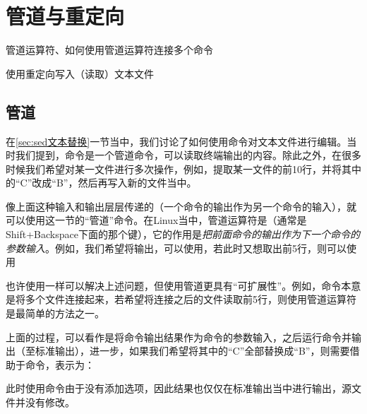 \section{管道与重定向}\label{sec:管道与重定向}

\begin{Abstract}
    \item 管道运算符、如何使用管道运算符连接多个命令
    \item 使用重定向写入（读取）文本文件
\end{Abstract}


\subsection{管道}\label{subsec:管道与重定向-管道}

在\ref{sec:sed文本替换}一节当中，我们讨论了如何使用命令对文本文件进行编辑。当时我们提到，命令是一个管道命令，可以读取终端输出的内容。除此之外，在很多时候我们希望对某一文件进行多次操作，例如，提取某一文件的前10行，并将其中的“C”改成“B”，然后再写入新的文件当中。

像上面这种输入和输出层层传递的（一个命令的输出作为另一个命令的输入），就可以使用这一节的“管道”命令。在Linux当中，管道运算符是\code{|}（通常是Shift+Backspace下面的那个键），它的作用是\emph{把前面命令的输出作为下一个命令的参数输入}。例如，我们希望将输出，可以使用，若此时又想取出前5行，则可以使用

\begin{attention}
    也许使用一样可以解决上述问题，但使用管道更具有“可扩展性”。例如，命令本意是将多个文件连接起来，若希望将连接之后的文件读取前5行，则使用管道运算符是最简单的方法之一。
\end{attention}

上面的过程，可以看作是将命令输出结果作为命令的参数输入，之后运行命令并输出（至标准输出），进一步，如果我们希望将其中的“C”全部替换成“B”，则需要借助于命令，表示为：

\begin{attention}
    此时使用命令由于没有添加选项，因此结果也仅仅在标准输出当中进行输出，源文件并没有修改。
\end{attention}

